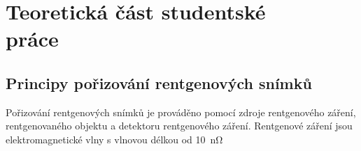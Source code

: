 \chapter[Teoretická část studentské práce]{Teoretická část studentské\\ práce}

\section{Principy pořizování rentgenových snímků}
Pořizování rentgenových snímků je prováděno pomocí zdroje rentgenového záření, rentgenovaného objektu a detektoru rentgenového záření. Rentgenové záření jsou elektromagnetické vlny s vlnovou délkou od \SI{10}{\nano\ohm}
